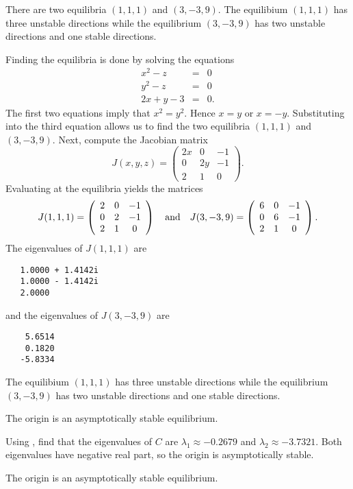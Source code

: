 \newpage
{} \ans There are two equilibria $(1,1,1)$ and $(3,-3,9)$.
The equilibium $(1,1,1)$ has three unstable directions while the
equilibrium $(3,-3,9)$ has two unstable directions and one stable directions.

\soln  Finding the equilibria is done by solving the equations
\begin{eqnarray*}
x^2-z & = & 0 \\
y^2-z & = & 0 \\
2x+y-3 & = & 0.
\end{eqnarray*}
The first two equations imply that $x^2=y^2$.  Hence $x=y$ or $x=-y$. 
Substituting into the third equation allows us to find the two equilibria
$(1,1,1)$ and $(3,-3,9)$.  Next, compute the Jacobian matrix
\[
J(x,y,z) = \left(\begin{array}{ccc}
2x & 0 & -1\\ 0 & 2y & -1\\ 2 & 1 & 0 \end{array}\right).
\]
Evaluating at the equilibria yields the matrices
\[
J(1,1,1) = \left(\begin{array}{ccc}
2 & 0 & -1\\ 0 & 2 & -1\\ 2 & 1 & 0 \end{array}\right)
\quad\mbox{and}\quad 
J(3,-3,9) = \left(\begin{array}{ccc}
6 & 0 & -1\\ 0 & 6 & -1\\ 2 & 1 & 0 \end{array}\right).
\]
The eigenvalues of $J(1,1,1)$ are
\begin{verbatim}
   1.0000 + 1.4142i
   1.0000 - 1.4142i
   2.0000     
\end{verbatim}
and the eigenvalues of $J(3,-3,9)$ are
\begin{verbatim}
    5.6514
    0.1820
   -5.8334
\end{verbatim}
The equilibium $(1,1,1)$ has three unstable directions while the
equilibrium $(3,-3,9)$ has two unstable directions and one stable 
directions.

\ans The origin is an asymptotically stable equilibrium.

\soln Using \Matlabp, find that the eigenvalues of $C$ are $\lambda_1
\approx -0.2679$ and $\lambda_2 \approx -3.7321$.  Both eigenvalues
have negative real part, so the origin is asymptotically stable.

\ans The origin is an asymptotically stable equilibrium.

